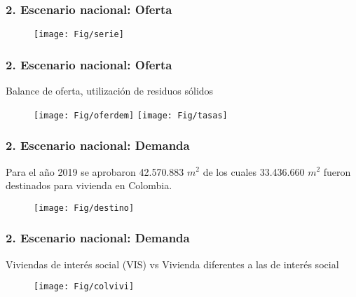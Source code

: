 \documentclass[10pt]{beamer}
\begin{document}
\begin{frame}
\frametitle{2. Escenario nacional: Oferta}
\begin{figure}
\texttt{[image: Fig/serie]}
\centering
  \label{fig:ejemplo}  
\end{figure}
\end{frame}



\begin{frame}
\frametitle{2. Escenario nacional: Oferta}
\begin{flushleft}
{\tiny Balance de oferta, utilización de residuos sólidos }
 \end{flushleft} 

\begin{figure}
{\texttt{[image: Fig/oferdem]}} 	{\texttt{[image: Fig/tasas]}}	
	\end{figure}

\end{frame}

\begin{frame}
\frametitle{2. Escenario nacional: Demanda}

\begin{flushleft}
{\tiny Para el año 2019 se aprobaron 42.570.883 $m^2$ de los cuales 33.436.660 $m^2$ fueron destinados para vivienda en Colombia.}
 \end{flushleft} 

\begin{figure}
\texttt{[image: Fig/destino]}
\centering
  \label{fig:ejemplo}  
\end{figure}
\end{frame}

\begin{frame}
\frametitle{2. Escenario nacional: Demanda}

\begin{flushleft}
{\tiny Viviendas de interés social (VIS) vs Vivienda diferentes a las de interés social}
 \end{flushleft} 

\begin{figure}
\texttt{[image: Fig/colvivi]}
\centering
  \label{fig:ejemplo}  
\end{figure}
\end{frame}
\end{document}
